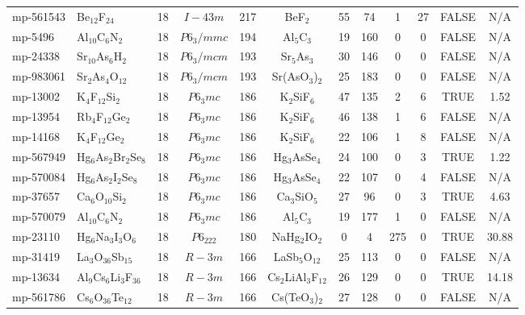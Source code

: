 {\begin{longtable}{llcccccccccc}
    mp-561543 & Be$_{12}$F$_{24}$ & 18    & $I-43m$ & 217   & BeF$_{2}$ & 55    & 74    & 1     & 27    & FALSE & N/A \\
    mp-5496 & Al$_{10}$C$_{6}$N$_{2}$ & 18    & $P6_3/mmc$ & 194   & Al$_{5}$C$_{3}$ & 19    & 160   & 0     & 0     & FALSE & N/A \\
    mp-24338 & Sr$_{10}$As$_{6}$H$_{2}$ & 18    & $P6_3/mcm$ & 193   & Sr$_{5}$As$_{3}$ & 30    & 146   & 0     & 0     & FALSE & N/A \\
    mp-983061 & Sr$_{2}$As$_{4}$O$_{12}$ & 18    & $P6_3/mcm$ & 193   & Sr(AsO$_{3}$)$_{2}$ & 25    & 183   & 0     & 0     & FALSE & N/A \\
    mp-13002 & K$_{4}$F$_{12}$Si$_{2}$ & 18    & $P6_3mc$ & 186   & K$_{2}$SiF$_{6}$ & 47    & 135   & 2     & 6     & TRUE  & 1.52  \\
    mp-13954 & Rb$_{4}$F$_{12}$Ge$_{2}$ & 18    & $P6_3mc$ & 186   & K$_{2}$SiF$_{6}$ & 46    & 138   & 1     & 6     & FALSE & N/A \\
    mp-14168 & K$_{4}$F$_{12}$Ge$_{2}$ & 18    & $P6_3mc$ & 186   & K$_{2}$SiF$_{6}$ & 22    & 106   & 1     & 8     & FALSE & N/A \\
    mp-567949 & Hg$_{6}$As$_{2}$Br$_{2}$Se$_{8}$ & 18    & $P6_3mc$ & 186   & Hg$_{3}$AsSe$_{4}$ & 24    & 100   & 0     & 3     & TRUE  & 1.22  \\
    mp-570084 & Hg$_{6}$As$_{2}$I$_{2}$Se$_{8}$ & 18    & $P6_3mc$ & 186   & Hg$_{3}$AsSe$_{4}$ & 22    & 107   & 0     & 4     & FALSE & N/A \\
    mp-37657 & Ca$_{6}$O$_{10}$Si$_{2}$ & 18    & $P6_3mc$ & 186   & Ca$_{3}$SiO$_{5}$ & 27    & 96    & 0     & 3     & TRUE  & 4.63  \\
    mp-570079 & Al$_{10}$C$_{6}$N$_{2}$ & 18    & $P6_3mc$ & 186   & Al$_{5}$C$_{3}$ & 19    & 177   & 1     & 0     & FALSE & N/A \\
    mp-23110 & Hg$_{6}$Na$_{3}$I$_{3}$O$_{6}$ & 18    & $P6_222$ & 180   & NaHg$_{2}$IO$_{2}$ & 0     & 4     & 275   & 0     & TRUE  & 30.88  \\
    mp-31419 & La$_{3}$O$_{36}$Sb$_{15}$ & 18    & $R-3m$ & 166   & LaSb$_{5}$O$_{12}$ & 25    & 113   & 0     & 0     & FALSE & N/A \\
    mp-13634 & Al$_{9}$Cs$_{6}$Li$_{3}$F$_{36}$ & 18    & $R-3m$ & 166   & Cs$_{2}$LiAl$_{3}$F$_{12}$ & 26    & 129   & 0     & 0     & TRUE  & 14.18  \\
    mp-561786 & Cs$_{6}$O$_{36}$Te$_{12}$ & 18    & $R-3m$ & 166   & Cs(TeO$_{3}$)$_{2}$ & 27    & 128   & 0     & 0     & FALSE & N/A \\

\end{longtable}}
